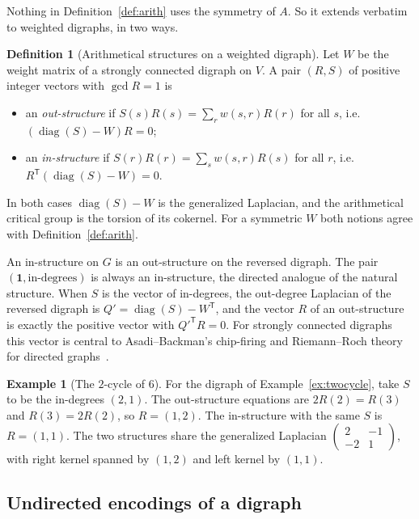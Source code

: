 \documentclass[11pt]{article}
\theoremstyle{definition}
\newtheorem{definition}[theorem]{Definition}
\newtheorem{example}[theorem]{Example}
\theoremstyle{remark}
\newcommand{\one}{\mathbf{1}}
\begin{document}
Nothing in Definition~\ref{def:arith} uses the symmetry of $A$.  So it
extends verbatim to weighted digraphs, in two ways.

\begin{definition}[Arithmetical structures on a weighted digraph]
Let $W$ be the weight matrix of a strongly connected digraph on $V$.  A pair
$(R,S)$ of positive integer vectors with $\gcd R=1$ is
\begin{itemize}[leftmargin=1.5em]
\item an \emph{out-structure} if $S(s)R(s)=\sum_r w(s,r)R(r)$ for all $s$,
  i.e.\ $(\operatorname{diag}(S)-W)R=0$;
\item an \emph{in-structure} if $S(r)R(r)=\sum_s w(s,r)R(s)$ for all $r$,
  i.e.\ $R^{\mathsf T}(\operatorname{diag}(S)-W)=0$.
\end{itemize}
In both cases $\operatorname{diag}(S)-W$ is the generalized Laplacian, and
the arithmetical critical group is the torsion of its cokernel.  For a
symmetric $W$ both notions agree with Definition~\ref{def:arith}.
\end{definition}

An in-structure on $G$ is an out-structure on the reversed digraph.  The
pair $(\one,\text{in-degrees})$ is always an in-structure, the directed
analogue of the natural structure.  When $S$ is the vector of in-degrees,
the out-degree Laplacian of the reversed digraph is
$Q'=\operatorname{diag}(S)-W^{\mathsf T}$, and the vector $R$ of an
out-structure is exactly the positive vector with $Q'^{\mathsf T}R=0$.  For
strongly connected digraphs this vector is central to Asadi--Backman's
chip-firing and Riemann--Roch theory for directed graphs~\cite{AsadiBackman}.

\begin{example}[The $2$-cycle of $6$]
For the digraph of Example~\ref{ex:twocycle}, take $S$ to be the in-degrees
$(2,1)$.  The out-structure equations are $2R(2)=R(3)$ and $R(3)=2R(2)$, so
$R=(1,2)$.  The in-structure with the same $S$ is $R=(1,1)$.  The two
structures share the generalized Laplacian
$\begin{pmatrix}2&-1\\-2&1\end{pmatrix}$, with right kernel spanned by
$(1,2)$ and left kernel by $(1,1)$.
\end{example}

\subsection{Undirected encodings of a digraph}\label{sec:encodings}
\end{document}
